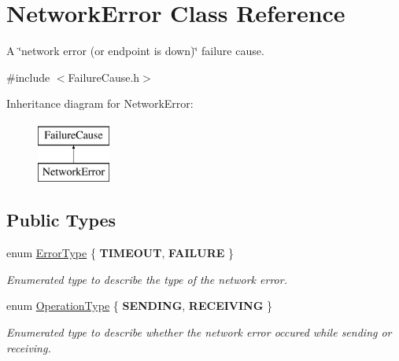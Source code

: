 \hypertarget{class_network_error}{}\section{Network\+Error Class Reference}
\label{class_network_error}


A \char`\"{}network error (or endpoint is down)\char`\"{} failure cause.  




{\ttfamily \#include $<$Failure\+Cause.\+h$>$}

Inheritance diagram for Network\+Error\+:\begin{figure}[H]
\begin{center}
\leavevmode
\includegraphics[height=2.000000cm]{class_network_error}
\end{center}
\end{figure}
\subsection*{Public Types}
\begin{DoxyCompactItemize}
\item 
\mbox{\label{class_network_error_ae246246514558a76f0b23e625419f369}} 
enum \hyperlink{class_network_error_ae246246514558a76f0b23e625419f369}{Error\+Type} \{ {\bfseries T\+I\+M\+E\+O\+UT}, 
{\bfseries F\+A\+I\+L\+U\+RE}
 \}\begin{DoxyCompactList}\small\item\em Enumerated type to describe the type of the network error. \end{DoxyCompactList}
\item 
\mbox{\label{class_network_error_a9b165a1aecdb6fb17c8de2daa719c48d}} 
enum \hyperlink{class_network_error_a9b165a1aecdb6fb17c8de2daa719c48d}{Operation\+Type} \{ {\bfseries S\+E\+N\+D\+I\+NG}, 
{\bfseries R\+E\+C\+E\+I\+V\+I\+NG}
 \}\begin{DoxyCompactList}\small\item\em Enumerated type to describe whether the network error occured while sending or receiving. \end{DoxyCompactList}
\end{DoxyCompactItemize}
